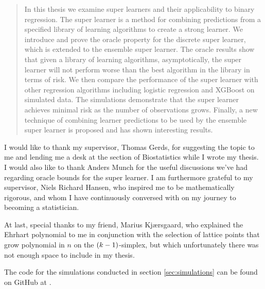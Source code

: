 \vspace{\fill}
\begin{abstract}
In this thesis we examine super learners and their applicability to binary regression. The super learner is a method for combining predictions from a specified library of learning algorithms to create a strong learner. We introduce and prove the oracle property for the discrete super learner, which is extended to the ensemble super learner. The oracle results show that given a library of learning algorithms, asymptotically, the super learner will not perform worse than the best algorithm in the library in terms of risk. We then compare the performance of the super learner with other regression algorithms including logistic regression and XGBoost on simulated data. The simulations demonstrate that the super learner achieves minimal risk as the number of observations grows. Finally, a new technique of combining learner predictions to be used by the ensemble super learner is proposed and has shown interesting results. 
\end{abstract}
\vspace{\fill}
\begin{acknowledgements}
   I would like to thank my supervisor, Thomas Gerds, for suggesting the topic to me and lending me a desk at the section of Biostatistics while I wrote my thesis. I would also like to thank Anders Munch for the useful discussions we've had regarding oracle bounds for the super learner. I am furthermore grateful to my supervisor, Niels Richard Hansen, who inspired me to be mathematically rigorous, and whom I have continuously conversed with on my journey to becoming a statistician.

   At last, special thanks to my friend, Marius Kjærsgaard, who explained the Ehrhart polynomial to me in conjunction with the selection of lattice points that grow polynomial in $ n $ on the $ (k-1) $-simplex, but which unfortunately there was not enough space to include in my thesis. 
\end{acknowledgements}
\vspace{\fill}
\begin{codeavailability}
    The code for the simulations conducted in section \ref{sec:simulations} can be found on GitHub at \citet{github}.
\end{codeavailability}
\vspace{\fill}

